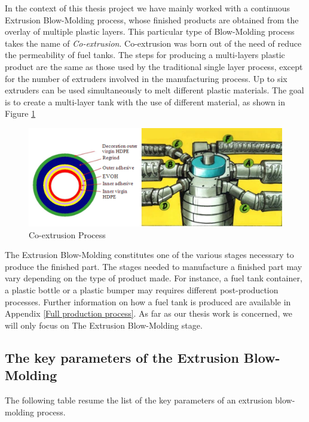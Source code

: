 In the context of this thesis project we have mainly worked with a continuous Extrusion Blow-Molding process, whose finished products are obtained from the overlay of multiple plastic layers. This particular type of Blow-Molding process takes the name of \textit{Co-extrusion}. Co-extrusion was born out of the need of reduce the permeability of fuel tanks. The steps for producing a multi-layers plastic product are the same as those used by the traditional single layer process, except for the number of extruders involved in the manufacturing process. Up to six extruders can be used simultaneously to melt different plastic materials. The goal is to create a multi-layer tank with the use of different material, as shown in
Figure \ref{fig:Co-extrusion Process}

\begin{figure}
\centerline{\includegraphics[scale=0.55]{images/chapter_1/coextrusion.png}}
\caption{Co-extrusion Process}
\label{fig:Co-extrusion Process}
\end{figure}

The Extrusion Blow-Molding constitutes one of the various stages necessary to produce the finished part. The stages needed to manufacture a finished part may vary depending on the type of product made. For instance, a fuel tank container, a plastic bottle or a plastic bumper may requires different post-production processes. Further information on how a fuel tank is produced are available in Appendix \ref{Full production process}. As far as our thesis work is concerned, we will only focus on The Extrusion Blow-Molding stage.


\subsection{The key parameters of the Extrusion Blow-Molding} \label{The key parameters of the Extrusion Blow-Molding}

The following table resume the list of the key parameters of an extrusion blow-molding process.

